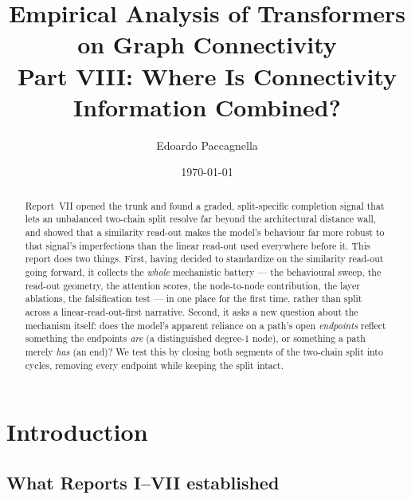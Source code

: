 \documentclass[11pt,a4paper]{article}
\title{Empirical Analysis of Transformers on Graph Connectivity \\
       \large Part VIII: Where Is Connectivity Information Combined?}
\author{Edoardo Paccagnella}
\date{\today}
\begin{document}
\maketitle


\begin{abstract}
\noindent Report~VII opened the trunk and found a graded, split-specific
completion signal that lets an unbalanced two-chain split resolve far beyond
the architectural distance wall, and showed that a similarity read-out makes
the model's behaviour far more robust to that signal's imperfections than the
linear read-out used everywhere before it. This report does two things.
First, having decided to standardize on the similarity read-out going
forward, it collects the \emph{whole} mechanistic battery --- the behavioural
sweep, the read-out geometry, the attention scores, the node-to-node
contribution, the layer ablations, the falsification test --- in one place
for the first time, rather than split across a linear-read-out-first
narrative. Second, it asks a new question about the mechanism itself: does
the model's apparent reliance on a path's open \emph{endpoints} reflect
something the endpoints \emph{are} (a distinguished degree-1 node), or
something a path merely \emph{has} (an end)? We test this by closing both
segments of the two-chain split into cycles, removing every endpoint while
keeping the split intact.
\end{abstract}

\section{Introduction}
\label{sec:intro}

\subsection{What Reports I--VII established}
\label{sec:recap}
\end{document}
